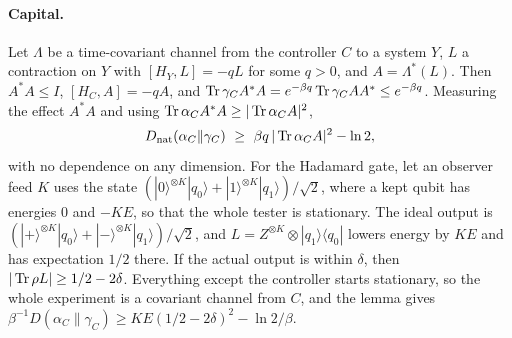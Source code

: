 \paragraph{Capital.} Let $\Lambda$ be a time-covariant channel from the controller $C$ to a system $Y$, $L$ a contraction on $Y$ with $[H_Y,L]=-qL$ for some $q>0$, and $A=\Lambda^*(L)$. Then $A^*A\le I$, $[H_C,A]=-qA$, and $\operatorname{Tr}\gamma_CA^*A=e^{-\beta q}\operatorname{Tr}\gamma_CAA^*\le e^{-\beta q}$. Measuring the effect $A^*A$ and using $\operatorname{Tr}\alpha_CA^*A\ge|\operatorname{Tr}\alpha_CA|^2$,
\[
D_{\mathrm{nat}}(\alpha_C\|\gamma_C)\ \ge\ \beta q\,|\operatorname{Tr}\alpha_CA|^2-\ln2,
\]
with no dependence on any dimension. For the Hadamard gate, let an observer feed $K$ uses the state $(|0\rangle^{\otimes K}|q_0\rangle+|1\rangle^{\otimes K}|q_1\rangle)/\sqrt2$, where a kept qubit has energies $0$ and $-KE$, so that the whole tester is stationary. The ideal output is $(|+\rangle^{\otimes K}|q_0\rangle+|-\rangle^{\otimes K}|q_1\rangle)/\sqrt2$, and $L=Z^{\otimes K}\otimes|q_1\rangle\langle q_0|$ lowers energy by $KE$ and has expectation $1/2$ there. If the actual output is within $\delta$, then $|\operatorname{Tr}\rho L|\ge1/2-2\delta$. Everything except the controller starts stationary, so the whole experiment is a covariant channel from $C$, and the lemma gives $\beta^{-1}D(\alpha_C\|\gamma_C)\ge KE(1/2-2\delta)^2-\ln2/\beta$.

